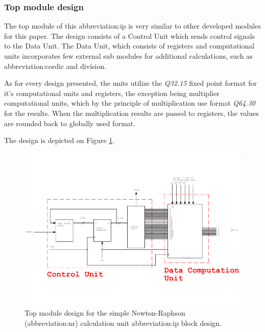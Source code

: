 \documentclass[a4paper, twoside, 11pt]{article}
\begin{document}
        \subsubsection{Top module design}
            The top module of this \gls{abbreviation:ip} is very similar to other developed modules for this paper. The design consists of a Control Unit which sends control signals to the Data Unit. The Data Unit, which consists of registers and computational units incorporates few external sub modules for additional calculations, such as \gls{abbreviation:cordic} and division.\par
            As for every design presented, the units utilize the \textit{Q32.15} fixed point format for it's computational units and registers, the exception being multiplier computational units, which by the principle of multiplication use format \textit{Q64.30} for the results. When the multiplication results are passed to registers, the values are rounded back to globally used format.\par
            The design is depicted on Figure \ref{fig:she-top-module}.


            \begin{figure}[htbp!]
                \centering
                \includegraphics[width=1\textwidth]{src/pdf/she-top-module.pdf}
                           \caption{Top module design for the simple Newton-Raphson (\gls{abbreviation:nr}) calculation unit \gls{abbreviation:ip} block design.}
                \label{fig:she-top-module}
            \end{figure}
\end{document}
